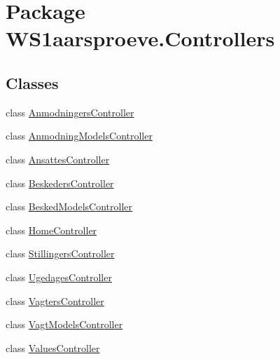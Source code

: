 \hypertarget{namespace_w_s1aarsproeve_1_1_controllers}{}\section{Package W\+S1aarsproeve.\+Controllers}
\label{namespace_w_s1aarsproeve_1_1_controllers}
\subsection*{Classes}
\begin{DoxyCompactItemize}
\item 
class \hyperlink{class_w_s1aarsproeve_1_1_controllers_1_1_anmodningers_controller}{Anmodningers\+Controller}
\item 
class \hyperlink{class_w_s1aarsproeve_1_1_controllers_1_1_anmodning_models_controller}{Anmodning\+Models\+Controller}
\item 
class \hyperlink{class_w_s1aarsproeve_1_1_controllers_1_1_ansattes_controller}{Ansattes\+Controller}
\item 
class \hyperlink{class_w_s1aarsproeve_1_1_controllers_1_1_beskeders_controller}{Beskeders\+Controller}
\item 
class \hyperlink{class_w_s1aarsproeve_1_1_controllers_1_1_besked_models_controller}{Besked\+Models\+Controller}
\item 
class \hyperlink{class_w_s1aarsproeve_1_1_controllers_1_1_home_controller}{Home\+Controller}
\item 
class \hyperlink{class_w_s1aarsproeve_1_1_controllers_1_1_stillingers_controller}{Stillingers\+Controller}
\item 
class \hyperlink{class_w_s1aarsproeve_1_1_controllers_1_1_ugedages_controller}{Ugedages\+Controller}
\item 
class \hyperlink{class_w_s1aarsproeve_1_1_controllers_1_1_vagters_controller}{Vagters\+Controller}
\item 
class \hyperlink{class_w_s1aarsproeve_1_1_controllers_1_1_vagt_models_controller}{Vagt\+Models\+Controller}
\item 
class \hyperlink{class_w_s1aarsproeve_1_1_controllers_1_1_values_controller}{Values\+Controller}
\end{DoxyCompactItemize}

